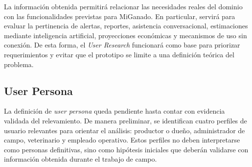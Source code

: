 La informaci\'on obtenida permitir\'a relacionar las necesidades reales del dominio con las funcionalidades previstas para MiGanado. En particular, servir\'a para evaluar la pertinencia de alertas, reportes, asistencia conversacional, estimaciones mediante inteligencia artificial, proyecciones econ\'omicas y mecanismos de uso sin conexi\'on. De esta forma, el \emph{User Research} funcionar\'a como base para priorizar requerimientos y evitar que el prototipo se limite a una definici\'on te\'orica del problema.

\subsection{User Persona}

La definici\'on de \emph{user persona} queda pendiente hasta contar con evidencia validada del relevamiento. De manera preliminar, se identifican cuatro perfiles de usuario relevantes para orientar el an\'alisis: productor o due\~no, administrador de campo, veterinario y empleado operativo. Estos perfiles no deben interpretarse como personas definitivas, sino como hip\'otesis iniciales que deber\'an validarse con informaci\'on obtenida durante el trabajo de campo.


